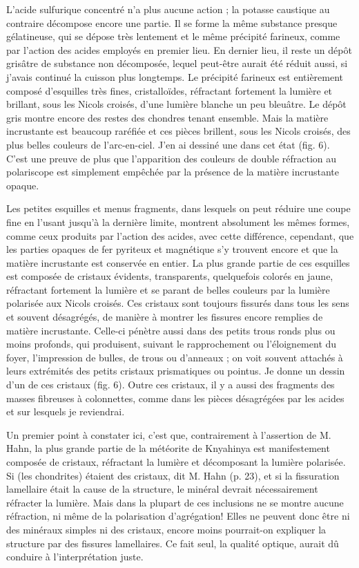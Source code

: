 \documentclass[a4paper, 12pt, oneside, french]{article}
\begin{document}
L'acide sulfurique concentré n'a plus aucune action ; la potasse caustique au contraire décompose encore une partie. Il se forme la même substance presque gélatineuse, qui se dépose très lentement et le même précipité farineux, comme par l'action des acides employés en premier lieu. En dernier lieu, il reste un dépôt grisâtre de substance non décomposée, lequel peut-être aurait été réduit aussi, si j'avais continué la cuisson plus longtemps. Le précipité farineux est entièrement composé d'esquilles très fines, cristalloïdes, réfractant fortement la lumière et brillant, sous les Nicols croisés, d'une lumière blanche un peu bleuâtre. Le dépôt gris montre encore des restes des chondres tenant ensemble. Mais la matière incrustante est beaucoup raréfiée et ces pièces brillent, sous les Nicols croisés, des plus belles couleurs de l'arc-en-ciel. J'en ai dessiné une dans cet état (fig. 6). C'est une preuve de plus que l'apparition des couleurs de double réfraction au polariscope est simplement empêchée par la présence de la matière incrustante opaque.

Les petites esquilles et menus fragments, dans lesquels on peut réduire une coupe fine en l'usant jusqu'à la dernière limite, montrent absolument les mêmes formes, comme ceux produits par l'action des acides, avec cette différence, cependant, que les parties opaques de fer pyriteux et magnétique s'y trouvent encore et que la matière incrustante est conservée en entier. La plus grande partie de ces esquilles est composée de cristaux évidents, transparents, quelquefois colorés en jaune, réfractant fortement la lumière et se parant de belles couleurs par la lumière polarisée aux Nicols croisés. Ces cristaux sont toujours fissurés dans tous les sens et souvent désagrégés, de manière à montrer les fissures encore remplies de matière incrustante. Celle-ci pénètre aussi dans des petits trous ronds plus ou moins profonds, qui produisent, suivant le rapprochement ou l'éloignement du foyer, l'impression de bulles, de trous ou d'anneaux ; on voit souvent attachés à leurs extrémités des petits cristaux prismatiques ou pointus. Je donne un dessin d'un de ces cristaux (fig. 6). Outre ces cristaux, il y a aussi des fragments des masses fibreuses à colonnettes, comme dans les pièces désagrégées par les acides et sur lesquels je reviendrai.

Un premier point à constater ici, c'est que, contrairement à l'assertion de M. Hahn, la plus grande partie de la météorite de Knyahinya est manifestement composée de cristaux, réfractant la lumière et décomposant la lumière polarisée. \og Si (les chondrites) étaient des cristaux, dit M. Hahn (p. 23), et si la fissuration lamellaire était la cause de la structure, le minéral devrait nécessairement réfracter la lumière. Mais dans la plupart de ces inclusions ne se montre aucune réfraction, ni même de la polarisation d'agrégation! Elles ne peuvent donc être ni des minéraux simples ni des cristaux, encore moins pourrait-on expliquer la structure par des fissures lamellaires. Ce fait seul, la qualité optique, aurait dû conduire à l'interprétation juste. \fg
\end{document}
